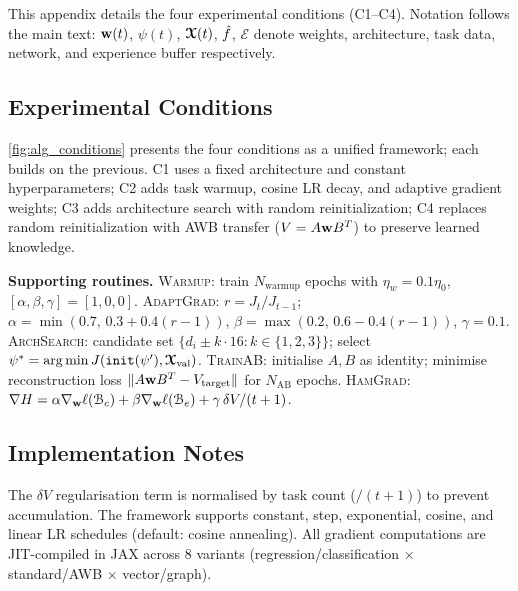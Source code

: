 This appendix details the four experimental conditions (C1--C4). Notation follows the main text: $\boldsymbol{\mathrm{w}}(t)$, $\psi(t)$, $\boldsymbol{\mathcal{X}}(t)$, $\hat{f}$, $\mathcal{E}$ denote weights, architecture, task data, network, and experience buffer respectively.

\subsection{Experimental Conditions}
\label{sec:supporting_algs}
\cref{fig:alg_conditions} presents the four conditions as a unified framework; each builds on the previous. C1 uses a fixed architecture and constant hyperparameters; C2 adds task warmup, cosine LR decay, and adaptive gradient weights; C3 adds architecture search with random reinitialization; C4 replaces random reinitialization with AWB transfer ($V=A\boldsymbol{\mathrm{w}} B^T$) to preserve learned knowledge.


\noindent\textbf{Supporting routines.}\label{alg:warmup}\label{alg:adaptive}\label{alg:arch_search}\label{alg:train_ab}\label{alg:hamiltonian}
\textsc{Warmup}: train $N_{\text{warmup}}$ epochs with $\eta_w=0.1\eta_0$, $[\alpha,\beta,\gamma]=[1,0,0]$.
\textsc{AdaptGrad}: $r=J_t/J_{t-1}$; $\alpha=\min(0.7,\,0.3+0.4(r-1))$, $\beta=\max(0.2,\,0.6-0.4(r-1))$, $\gamma=0.1$.
\textsc{ArchSearch}: candidate set $\{d_i \pm k{\cdot}16:k\!\in\!\{1,2,3\}\}$; select $\psi^*=\arg\min J(\texttt{init}(\psi'),\boldsymbol{\mathcal{X}}_{\text{val}})$.
\textsc{TrainAB}: initialise $A,B$ as identity; minimise reconstruction loss $\|A\boldsymbol{\mathrm{w}} B^T - V_{\text{target}}\|$ for $N_{\text{AB}}$ epochs.
\textsc{HamGrad}: $\nabla H = \alpha\nabla_{\boldsymbol{\mathrm{w}}}\ell(\mathcal{B}_c)+\beta\nabla_{\boldsymbol{\mathrm{w}}}\ell(\mathcal{B}_e)+\gamma\,\delta V/(t+1)$.

\subsection{Implementation Notes}
The $\delta V$ regularisation term is normalised by task count ($/(t+1)$) to prevent accumulation. The framework supports constant, step, exponential, cosine, and linear LR schedules (default: cosine annealing). All gradient computations are JIT-compiled in JAX across 8 variants (regression/classification $\times$ standard/AWB $\times$ vector/graph).
